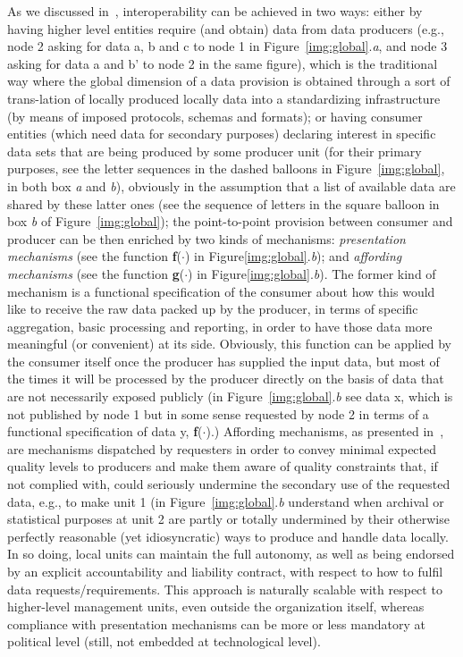 \documentclass{article}
\begin{document}
As we discussed in~\citep{cabitza_whatever_2012}, interoperability can be achieved in two ways: either by having higher level entities require (and obtain) data from data producers (e.g., node 2 asking for data a, b and c to node 1 in Figure~\ref{img:global}.\textit{a}, and node 3 asking for data a and b' to node 2 in the same figure), which is the traditional way where the global dimension of a data provision is obtained through a sort of trans-lation of locally produced locally data into a standardizing infrastructure (by means of imposed protocols, schemas and formats); or having consumer entities (which need data for secondary purposes) declaring interest in specific data sets that are being produced by some producer unit (for their primary purposes, see the letter sequences in the dashed balloons in Figure~\ref{img:global}, in both box \textit{a} and \textit{b}), obviously in the assumption that a list of available data are shared by these latter ones (see the sequence of letters in the square balloon in box \textit{b} of Figure~\ref{img:global}); the point-to-point provision between consumer and producer can be then enriched by two kinds of mechanisms: \emph{presentation mechanisms} (see the function \textbf{f}($\cdot$) in Figure\ref{img:global}.\textit{b}); and \emph{affording mechanisms} (see the function \textbf{g}($\cdot$) in Figure\ref{img:global}.\textit{b}). The former kind of mechanism is a functional specification of the consumer about how this would like to receive the raw data packed up by the producer, in terms of specific aggregation, basic processing and reporting, in order to have those data more meaningful (or convenient) at its side. Obviously, this function can be applied by the consumer itself once the producer has supplied the input data, but most of the times it will be processed by the producer directly on the basis of data that are not necessarily exposed publicly (in Figure~\ref{img:global}.\textit{b} see data x, which is not published by node 1 but in some sense requested by node 2 in terms of a functional specification of data y, \textbf{f}($\cdot$).)
Affording mechanisms, as presented in~\citep{cabitza_whatever_2012}, are mechanisms dispatched by requesters in order to convey minimal expected quality levels to producers and make them aware of quality constraints that, if not complied with, could seriously undermine the secondary use of the requested data, e.g., to make unit 1 (in Figure~\ref{img:global}.\textit{b} understand when archival or statistical purposes at unit 2 are partly or totally undermined by their otherwise perfectly reasonable (yet idiosyncratic) ways to produce and handle data locally. In so doing, local units can maintain the full autonomy, as well as being endorsed by an explicit accountability and liability contract, with respect to how to fulfil data requests/requirements. This approach is naturally scalable with respect to higher-level management units, even outside the organization itself, whereas compliance with presentation mechanisms can be more or less mandatory at political level (still, not embedded at technological level).
\end{document}
